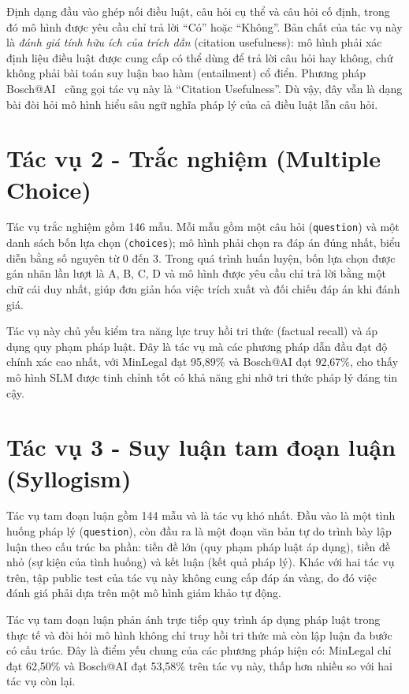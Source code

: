 Định dạng đầu vào ghép nối điều luật, câu hỏi cụ thể và câu hỏi cố định, trong đó mô hình được yêu cầu chỉ trả lời ``Có'' hoặc ``Không''. Bản chất của tác vụ này là \emph{đánh giá tính hữu ích của trích dẫn} (citation usefulness): mô hình phải xác định liệu điều luật được cung cấp có thể dùng để trả lời câu hỏi hay không, chứ không phải bài toán suy luận bao hàm (entailment) cổ điển. Phương pháp Bosch@AI~\cite{quang2025bosch} cũng gọi tác vụ này là ``Citation Usefulness''. Dù vậy, đây vẫn là dạng bài đòi hỏi mô hình hiểu sâu ngữ nghĩa pháp lý của cả điều luật lẫn câu hỏi.

\section{Tác vụ 2 - Trắc nghiệm (Multiple Choice)}

Tác vụ trắc nghiệm gồm 146 mẫu. Mỗi mẫu gồm một câu hỏi (\texttt{question}) và một danh sách bốn lựa chọn (\texttt{choices}); mô hình phải chọn ra đáp án đúng nhất, biểu diễn bằng số nguyên từ 0 đến 3. Trong quá trình huấn luyện, bốn lựa chọn được gán nhãn lần lượt là A, B, C, D và mô hình được yêu cầu chỉ trả lời bằng một chữ cái duy nhất, giúp đơn giản hóa việc trích xuất và đối chiếu đáp án khi đánh giá.

Tác vụ này chủ yếu kiểm tra năng lực truy hồi tri thức (factual recall) và áp dụng quy phạm pháp luật. Đây là tác vụ mà các phương pháp dẫn đầu đạt độ chính xác cao nhất, với MinLegal đạt 95,89\% và Bosch@AI đạt 92,67\%, cho thấy mô hình SLM được tinh chỉnh tốt có khả năng ghi nhớ tri thức pháp lý đáng tin cậy.

\section{Tác vụ 3 - Suy luận tam đoạn luận (Syllogism)}

Tác vụ tam đoạn luận gồm 144 mẫu và là tác vụ khó nhất. Đầu vào là một tình huống pháp lý (\texttt{question}), còn đầu ra là một đoạn văn bản tự do trình bày lập luận theo cấu trúc ba phần: tiền đề lớn (quy phạm pháp luật áp dụng), tiền đề nhỏ (sự kiện của tình huống) và kết luận (kết quả pháp lý). Khác với hai tác vụ trên, tập public test của tác vụ này không cung cấp đáp án vàng, do đó việc đánh giá phải dựa trên một mô hình giám khảo tự động.

Tác vụ tam đoạn luận phản ánh trực tiếp quy trình áp dụng pháp luật trong thực tế và đòi hỏi mô hình không chỉ truy hồi tri thức mà còn lập luận đa bước có cấu trúc. Đây là điểm yếu chung của các phương pháp hiện có: MinLegal chỉ đạt 62,50\% và Bosch@AI đạt 53,58\% trên tác vụ này, thấp hơn nhiều so với hai tác vụ còn lại.

